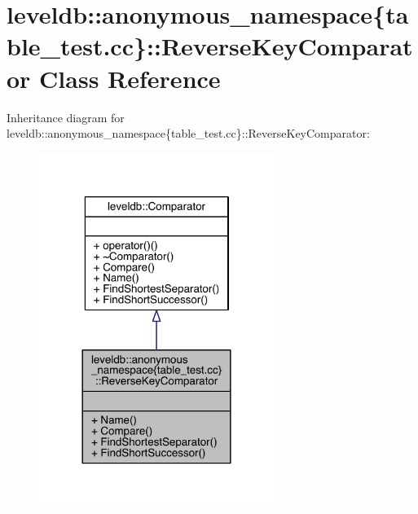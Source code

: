 \hypertarget{classleveldb_1_1anonymous__namespace_02table__test_8cc_03_1_1_reverse_key_comparator}{}\section{leveldb\+:\+:anonymous\+\_\+namespace\{table\+\_\+test.\+cc\}\+:\+:Reverse\+Key\+Comparator Class Reference}
\label{classleveldb_1_1anonymous__namespace_02table__test_8cc_03_1_1_reverse_key_comparator}


Inheritance diagram for leveldb\+:\+:anonymous\+\_\+namespace\{table\+\_\+test.\+cc\}\+:\+:Reverse\+Key\+Comparator\+:
\nopagebreak
\begin{figure}[H]
\begin{center}
\leavevmode
\includegraphics[width=216pt]{classleveldb_1_1anonymous__namespace_02table__test_8cc_03_1_1_reverse_key_comparator__inherit__graph}
\end{center}
\end{figure}


